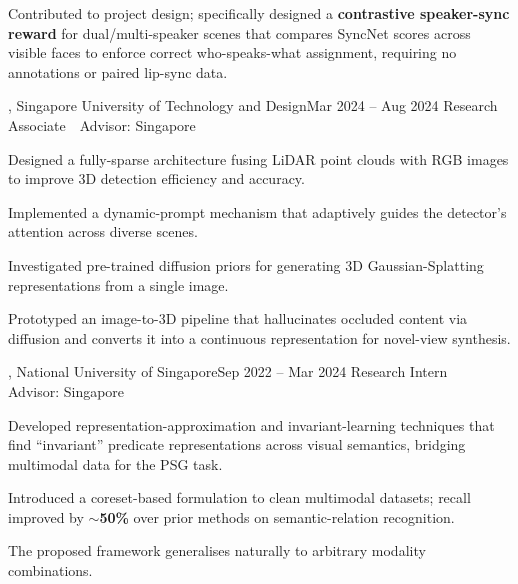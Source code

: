   \cvListStart
    \item Contributed to project design; specifically designed a \textbf{contrastive speaker-sync reward} for dual/multi-speaker scenes that compares SyncNet scores across visible faces to enforce correct who-speaks-what assignment, requiring no annotations or paired lip-sync data.
  \cvListEnd

  \item
  \cvHeading
    {, Singapore University of Technology and Design}{Mar 2024 -- Aug 2024}
    {Research Associate \,\textperiodcentered\, Advisor: }{Singapore}

  \cvListStart
    \item Designed a fully-sparse architecture fusing LiDAR point clouds with RGB images to improve 3D detection efficiency and accuracy.
    \item Implemented a dynamic-prompt mechanism that adaptively guides the detector's attention across diverse scenes.
  \cvListEnd

  \cvListStart
    \item Investigated pre-trained diffusion priors for generating 3D Gaussian-Splatting representations from a single image.
    \item Prototyped an image-to-3D pipeline that hallucinates occluded content via diffusion and converts it into a continuous representation for novel-view synthesis.
  \cvListEnd

  \item
  \cvHeading
    {, National University of Singapore}{Sep 2022 -- Mar 2024}
    {Research Intern \,\textperiodcentered\, Advisor: }{Singapore}

  \cvListStart
    \item Developed representation-approximation and invariant-learning techniques that find ``invariant'' predicate representations across visual semantics, bridging multimodal data for the PSG task.
    \item Introduced a coreset-based formulation to clean multimodal datasets; recall improved by $\sim$\textbf{50\%} over prior methods on semantic-relation recognition.
    \item The proposed framework generalises naturally to arbitrary modality combinations.
  \cvListEnd

